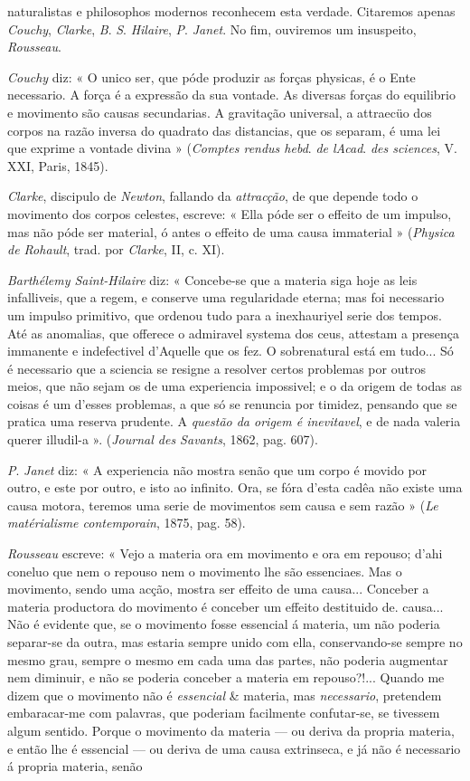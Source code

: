 naturalistas e philosophos modernos reconhecem esta verdade. Citaremos apenas \emph{Couchy}, \emph{Clarke}, \emph{B}. \emph{S}. \emph{Hilaire}, \emph{P}. \emph{Janet}. No fim, ouviremos um insuspeito, \emph{Rousseau}.\par \emph{Couchy} diz: « O unico ser, que póde produzir as forças physicas, é o Ente necessario. A força é a expressão da sua vontade. As diversas forças do equilibrio e movimento são causas secundarias. A gravitação universal, a attraecüo dos corpos na razão inversa do quadrato das distancias, que os separam, é uma lei que exprime a vontade divina » (\emph{Comptes rendus hebd}. \emph{de lAcad}. \emph{des sciences}, V. XXI, Paris, 1845).\par \emph{Clarke}, discipulo de \emph{Newton}, fallando da \emph{attracção}, de que depende todo o movimento dos corpos celestes, escreve: « Ella póde ser o effeito de um impulso, mas não póde ser material, ó antes o effeito de uma causa immaterial » (\emph{Physica de Rohault}, trad. por \emph{Clarke}, II, c. XI).\par \emph{Barthélemy Saint-Hilaire} diz: « Concebe-se que a materia siga hoje as leis infalliveis, que a regem, e conserve uma regularidade eterna; mas foi necessario um impulso primitivo, que ordenou tudo para a inexhauriyel serie dos tempos. Até as anomalias, que offerece o admiravel systema dos ceus, attestam a presença immanente e indefectivel d'Aquelle que os fez. O sobrenatural está em tudo... Só é necessario que a sciencia se resigne a resolver certos problemas por outros meios, que não sejam os de uma experiencia impossivel; e o da origem de todas as coisas é um d'esses problemas, a que só se renuncia por timidez, pensando que se pratica uma reserva prudente. A \emph{questão da origem é inevitavel}, e de nada valeria querer illudil-a ». (\emph{Journal des Savants}, 1862, pag. 607).\par \emph{P}. \emph{Janet} diz: « A experiencia não mostra senão que um corpo é movido por outro, e este por outro, e isto ao infinito. Ora, se fóra d'esta cadêa não existe uma causa motora, teremos uma serie de movimentos sem causa e sem razão » (\emph{Le matérialisme contemporain}, 1875, pag. 58).\par \emph{Rousseau} escreve: « Vejo a materia ora em movimento e ora em repouso; d'ahi coneluo que nem o repouso nem o movimento lhe são essenciaes. Mas o movimento, sendo uma acção, mostra ser effeito de uma causa... Conceber a materia productora do movimento é conceber um effeito destituido de. causa... Não é evidente que, se o movimento fosse essencial á materia, um não poderia separar-se da outra, mas estaria sempre unido com ella, conservando-se sempre no mesmo grau, sempre o mesmo em cada uma das partes, não poderia augmentar nem diminuir, e não se poderia conceber a materia em repouso?!... Quando me dizem que o movimento não é \emph{essencial} \& materia, mas \emph{necessario}, pretendem embaracar-me com palavras, que poderiam facilmente confutar-se, se tivessem algum sentido. Porque o movimento da materia --- ou deriva da propria materia, e então lhe é essencial --- ou deriva de uma causa extrinseca, e já não é necessario á propria materia, senão 